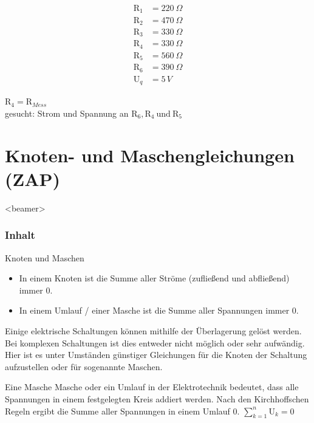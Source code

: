   \begin{align*}
    \text{R}_{1} &= 220\ \Omega \\
    \text{R}_{2} &= 470\ \Omega \\
    \text{R}_{3} &= 330\ \Omega \\
    \text{R}_{4} &= 330\ \Omega \\
    \text{R}_{5} &= 560\ \Omega \\
    \text{R}_{6} &= 390\ \Omega \\
    \text{U}_q &= 5\,V
  \end{align*}

  $\text{R}_4 = \text{R}_{Mess}$ \\gesucht: Strom und Spannung an $\text{R}_6, \text{R}_4\  \text{und} \ \text{R}_5$\\


\section[Gleichungen]{Knoten- und Maschengleichungen (ZAP)}
\begin{frame}<beamer>
  \frametitle{Inhalt}
\end{frame}

\begin{frame}{Knoten und Maschen}
  \begin{itemize}
   \item In einem Knoten ist die Summe aller Ströme (zufließend und abfließend) immer 0.
   \item In einem Umlauf / einer Masche ist die Summe aller Spannungen immer 0.
  \end{itemize}
\end{frame}

Einige elektrische Schaltungen können mithilfe der Überlagerung gelöst werden. Bei komplexen Schaltungen ist dies entweder nicht möglich oder sehr aufwändig. Hier ist es unter Umständen günstiger Gleichungen für die Knoten der Schaltung aufzustellen oder für sogenannte Maschen.

Eine Masche Masche oder ein Umlauf in der Elektrotechnik bedeutet, dass alle Spannungen in einem festgelegten Kreis addiert werden. Nach den Kirchhoffschen Regeln ergibt die Summe aller Spannungen in einem Umlauf 0. $\sum_{k=1}^n \text{U}_k = 0$

